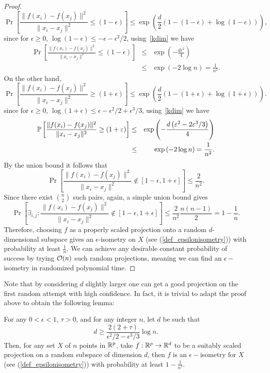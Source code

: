 \begin{proof}
\[
 \Pr\left[ \frac{\|f(x_i)-f(x_j)\|^2}{\|x_i-x_j\|^2} \leq (1-\epsilon) \right] \leq \exp\left( \frac{d}2(1-(1-\epsilon) +\log(1-\epsilon)) \right),
\]
since for $\epsilon\geq 0$, $\log(1-\epsilon) \leq -\epsilon -\epsilon^2/2$, using~\eqref{kdim} we have
\begin{eqnarray*}
 \Pr\left[ \frac{\|f(x_i)-f(x_j)\|^2}{\|x_i-x_j\|^2} \leq (1-\epsilon) \right] & \leq & \exp\left( -\frac{d\epsilon^2}4 \right) \\
      & \leq & \exp\left( -2\log n \right) = \frac1{n^2}.
\end{eqnarray*}
On the other hand,
\[
 \Pr\left[ \frac{\|f(x_i)-f(x_j)\|^2}{\|x_i-x_j\|^2} \geq (1+\epsilon) \right] \leq \exp\left( \frac{d}2(1-(1+\epsilon) +\log(1+\epsilon)) \right).
\]
since for $\epsilon\geq 0$, $\log(1+\epsilon) \leq \epsilon -\epsilon^2/2 + \epsilon^3/3$, using~\eqref{kdim} we have
\begin{eqnarray*}
 {\mathbb{P}}\left[ \frac{\|f(x_i)-f(x_j)\|^2}{\|x_i-x_j\|^2} \geq (1+\varepsilon) \right] & \leq & \exp\left( -\frac{d\left(\varepsilon^2 - 2\varepsilon^3/3\right)}4 \right) \\
      & \leq & \exp\left( -2\log n \right) = \frac1{n^2}.
\end{eqnarray*}
By the union bound it follows that 
\[
 \Pr\left[ \frac{\|f(x_i)-f(x_j)\|^2}{\|x_i-x_j\|^2} \notin [1-\epsilon,1+\epsilon] \right] \leq \frac2{n^2}.
\]
Since there exist ${n \choose 2}$ such pairs, again, a simple union bound gives
\[
 \Pr\left[ \exists_{i,j}:\frac{\|f(x_i)-f(x_j)\|^2}{\|x_i-x_j\|^2} \notin [1-\epsilon,1+\epsilon] \right] \leq \frac2{n^2} \frac{n(n-1)}{2} = 1-\frac1n.
\]
Therefore, choosing $f$ as a properly scaled projection onto a random $d$-dimensional subspace gives an $\epsilon$-isometry on $X$ (see (\ref{def_epsilonisometry})) with probability at least $\frac1n$. We can achieve any desirable constant probability of success by trying $\mathcal{O}(n)$ such random projections, meaning we can find an $\epsilon-$isometry in randomized polynomial time.

\end{proof}

Note that by considering $d$ slightly larger one can get a good projection on the first random attempt with  high confidence. In fact, it is trivial to adapt the proof above to obtain the following lemma:

\begin{proposition}\label{JL_random}
 For any $0<\epsilon<1$, $\tau>0$, and for any integer $n$, let $d$ be such that
\[
 d \geq \frac{2(2+\tau)}{\epsilon^2/2 - \epsilon^3/3}\log n.
\]
Then, for any set $X$ of $n$ points in $\mathbb{R}^p$, take $f:\mathbb{R}^p\to\mathbb{R}^d$ to be a suitably scaled projection on a random subspace of dimension $d$, then $f$ is an $\epsilon-$isometry for $X$ (see (\ref{def_epsilonisometry})) with probability at least $1-\frac1{n^{\tau}}$.
\end{proposition}

